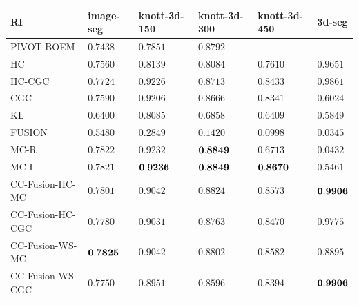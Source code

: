 \documentclass[10pt,twocolumn,letterpaper]{article}
\theoremstyle{definition}
\newcommand{\rd}{\color{red}}
\begin{document}
\begin{table}[t]
   \begin{tabular}{llllll}
      \toprule
          RI              &  image-seg   & knott-3d-150 & knott-3d-300   & knott-3d-450  &3d-seg\\
      \midrule 
         PIVOT-BOEM       &   $ 0.7438$  &\rd $ 0.7851$ &    $  0.8792$  &      --       &  --\\ 
         HC               &   $ 0.7560$  &\rd $ 0.8139$ &\rd $  0.8084$  &\rd $ 0.7610$  &   $ 0.9651$\\
         HC-CGC           &   $ 0.7724$  &    $ 0.9226$ &    $  0.8713$  &    $ 0.8433$  &   $ 0.9861$ \\
         CGC              &   $ 0.7590$  &    $ 0.9206$ &    $  0.8666$  &    $ 0.8341$  &\rd$ 0.6024$ \\
         KL               &\rd$ 0.6400$  &\rd $ 0.8085$ &\rd $  0.6858$  &\rd $ 0.6409$  &\rd$ 0.5849$\\
         FUSION           &\rd$ 0.5480$  &\rd $ 0.2849$ &\rd $  0.1420$  &\rd $ 0.0998$  &\rd$ 0.0345$ \\
         MC-R             &   $ 0.7822$  &    $ 0.9232$ & $\bf  0.8849$  &\rd $ 0.6713$  &\rd$ 0.0432$ \\   
         MC-I             &   $ 0.7821$  & $\bf 0.9236$ & $\bf  0.8849$  & $\bf 0.8670$  &\rd$ 0.5461$\\  
         CC-Fusion-HC-MC   &   $ 0.7801$  &    $ 0.9042$ &    $  0.8824$  &    $ 0.8573$ &$\bf 0.9906$ \\  
         CC-Fusion-HC-CGC  &   $ 0.7780$  &    $ 0.9031$ &    $  0.8763$  &    $ 0.8470$ &   $ 0.9775$ \\  
         CC-Fusion-WS-MC   &$\bf 0.7825$  &    $ 0.9042$ &    $  0.8802$  &    $ 0.8582$ &   $ 0.8895$ \\  
         CC-Fusion-WS-CGC  &   $ 0.7750$  &    $ 0.8951$ &    $  0.8596$  &    $ 0.8394$ &   $\bf 0.9906$ \\      
      \bottomrule
   \end{tabular}
\end{table}

%
\end{document}
